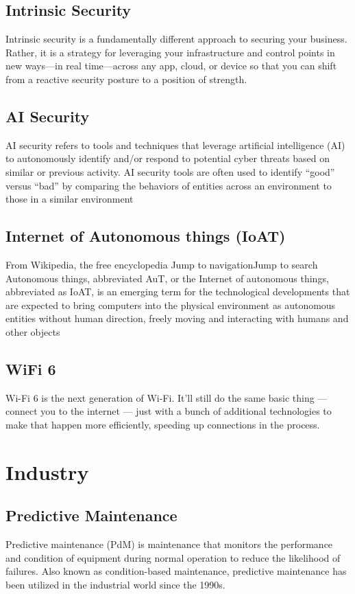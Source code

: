 \documentclass[10pt,a4paper]{article}
\begin{document}
\subsection{Intrinsic Security}
\justifying
Intrinsic security is a fundamentally different approach to securing your business. Rather, it is a strategy for leveraging your infrastructure and control points in new ways—in real time—across any app, cloud, or device so that you can shift from a reactive security posture to a position of strength.
\subsection{AI Security}
\justifying
AI security refers to tools and techniques that leverage artificial intelligence (AI) to autonomously identify and/or respond to potential cyber threats based on similar or previous activity. AI security tools are often used to identify “good” versus “bad” by comparing the behaviors of entities across an environment to those in a similar environment
\subsection{Internet of Autonomous things (IoAT)}
\justifying
From Wikipedia, the free encyclopedia
Jump to navigationJump to search
Autonomous things, abbreviated AuT, or the Internet of autonomous things, abbreviated as IoAT, is an emerging term for the technological developments that are expected to bring computers into the physical environment as autonomous entities without human direction, freely moving and interacting with humans and other objects
\subsection{WiFi 6}
\justifying
Wi-Fi 6 is the next generation of Wi-Fi. It’ll still do the same basic thing — connect you to the internet — just with a bunch of additional technologies to make that happen more efficiently, speeding up connections in the process.
\section{Industry}
\subsection{Predictive Maintenance}
\justifying
Predictive maintenance (PdM) is maintenance that monitors the performance and condition of equipment during normal operation to reduce the likelihood of failures. Also known as condition-based maintenance, predictive maintenance has been utilized in the industrial world since the 1990s.
\end{document}
